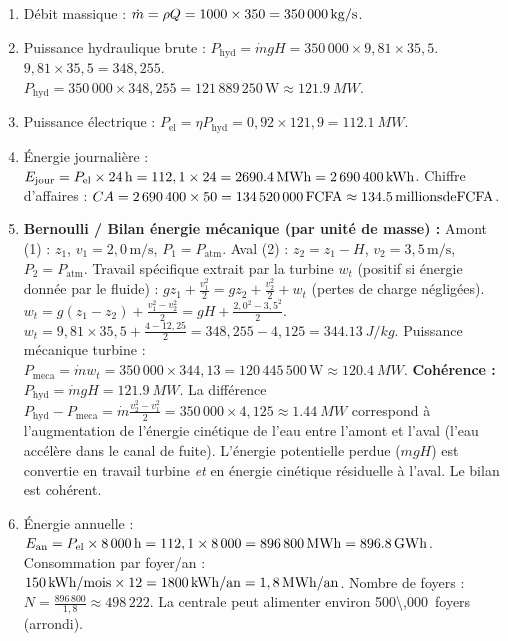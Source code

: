 \documentclass[11pt]{article}
\begin{document}
\begin{corrige}
\begin{enumerate}
    \item Débit massique : $\dot{m} = \rho Q = 1000 \times 350 = \SI{350\,000}{kg/s}$.
    \item Puissance hydraulique brute : $P_{\text{hyd}} = \dot{m} g H = 350\,000 \times 9,81 \times 35,5$.
    $9,81 \times 35,5 = 348,255$.
    $P_{\text{hyd}} = 350\,000 \times 348,255 = 121\,889\,250\,\text{W} \approx \SI{121,9}{MW}$.
    \item Puissance électrique : $P_{\text{el}} = \eta P_{\text{hyd}} = 0,92 \times 121,9 = \SI{112,1}{MW}$.
    \item Énergie journalière : $E_{\text{jour}} = P_{\text{el}} \times 24\,\text{h} = 112,1 \times 24 = \SI{2\,690,4}{MWh} = 2\,690\,400\,\text{kWh}$.
    Chiffre d'affaires : $CA = 2\,690\,400 \times 50 = \SI{134\,520\,000}{FCFA} \approx \SI{134,5}{millions de FCFA}$.
    \item \textbf{Bernoulli / Bilan énergie mécanique (par unité de masse) :}
    Amont (1) : $z_1$, $v_1 = 2,0\,\text{m/s}$, $P_1 = P_{\text{atm}}$.
    Aval (2) : $z_2 = z_1 - H$, $v_2 = 3,5\,\text{m/s}$, $P_2 = P_{\text{atm}}$.
    Travail spécifique extrait par la turbine $w_t$ (positif si énergie donnée par le fluide) :
    $g z_1 + \frac{v_1^2}{2} = g z_2 + \frac{v_2^2}{2} + w_t$ (pertes de charge négligées).
    $w_t = g(z_1 - z_2) + \frac{v_1^2 - v_2^2}{2} = gH + \frac{2,0^2 - 3,5^2}{2}$.
    $w_t = 9,81 \times 35,5 + \frac{4 - 12,25}{2} = 348,255 - 4,125 = \SI{344,13}{J/kg}$.
    Puissance mécanique turbine : $P_{\text{meca}} = \dot{m} w_t = 350\,000 \times 344,13 = 120\,445\,500\,\text{W} \approx \SI{120,4}{MW}$.
    \textbf{Cohérence :} $P_{\text{hyd}} = \dot{m} g H = \SI{121,9}{MW}$.
    La différence $P_{\text{hyd}} - P_{\text{meca}} = \dot{m} \frac{v_2^2 - v_1^2}{2} = 350\,000 \times 4,125 \approx \SI{1,44}{MW}$ correspond à l'augmentation de l'énergie cinétique de l'eau entre l'amont et l'aval (l'eau accélère dans le canal de fuite). L'énergie potentielle perdue ($mgH$) est convertie en travail turbine \emph{et} en énergie cinétique résiduelle à l'aval. Le bilan est cohérent.
    \item Énergie annuelle : $E_{\text{an}} = P_{\text{el}} \times 8\,000\,\text{h} = 112,1 \times 8\,000 = \SI{896\,800}{MWh} = \SI{896,8}{GWh}$.
    Consommation par foyer/an : $150\,\text{kWh/mois} \times 12 = \SI{1\,800}{kWh/an} = 1,8\,\text{MWh/an}$.
    Nombre de foyers : $N = \frac{896\,800}{1,8} \approx 498\,222$.
    La centrale peut alimenter environ \SI{500\,000}{foyers} (arrondi).
\end{enumerate}
\end{corrige}
\end{document}
